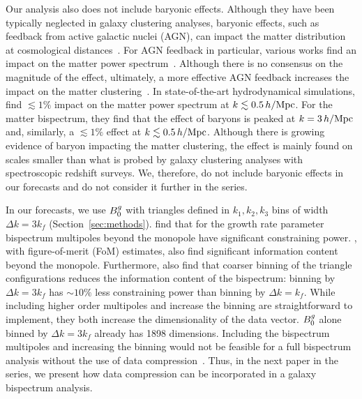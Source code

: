 Our analysis also does not include baryonic effects. Although they have been 
typically neglected in galaxy clustering analyses, baryonic effects, such as
feedback from active galactic nuclei (AGN), can impact the matter distribution
at cosmological distances~\citep[\eg][]{white2004, zhan2004, jing2006,
rudd2008, harnois-deraps2015}. %
For AGN feedback in particular, various works find an impact on the matter 
power spectrum~\citep[\eg][]{vandaalen2011, vogelsberger2014, hellwing2016, peters2018,
springel2018, chisari2018, vandaalen2020}. %
Although there is no consensus on the magnitude of the effect, ultimately, a 
more effective AGN feedback increases the impact on the matter 
clustering~\citep{barreira2019}. In state-of-the-art hydrodynamical simulations,
\cite{foreman2019} find $\lesssim 1\%$ impact on 
the matter power spectrum at $k \lesssim 0.5\,h/\mathrm{Mpc}$. For the matter bispectrum, 
they find that the effect of baryons is peaked at $k=3\,h/\mathrm{Mpc}$ and, 
similarly, a $\lesssim1\%$ effect at $k \lesssim 0.5\,h/\mathrm{Mpc}$. Although there is growing
evidence of baryon impacting the matter clustering, the effect is mainly
found on scales smaller than what is probed by galaxy clustering analyses with
spectroscopic redshift surveys. We, therefore, do not include baryonic effects
in our forecasts and do not consider it further in the series. 

In our forecasts, we use $B^g_0$ with triangles defined in $k_1,k_2,k_3$ bins of
width $\Delta k = 3 k_f$ (Section~\ref{sec:methods}).
\cite{gagrani2017} find that for the growth rate parameter bispectrum
multipoles beyond the monopole have significant constraining power.  
\cite{yankelevich2019}, with figure-of-merit (FoM) estimates, also find
significant information content beyond the monopole. Furthermore, 
\cite{yankelevich2019} also find that coarser binning of the triangle
configurations reduces the information content of the bispectrum: binning by
$\Delta k = 3 k_f$ has ${\sim}10\%$ less constraining power than binning by
$\Delta k = k_f$. While including higher order multipoles and increase the binning 
are straightforward to implement, they both increase the dimensionality of the 
data vector. $B^g_0$ alone binned by $\Delta k = 3 k_f$ already has 1898
dimensions. Including the bispectrum multipoles and increasing the
binning would not be feasible for a full bispectrum analysis without the use of data
compression~\citep[\eg][]{byun2017, gualdi2018, gualdi2019a, gualdi2019b}. 
Thus, in the next paper in the series, we present how data compression can be
incorporated in a galaxy bispectrum analysis.

